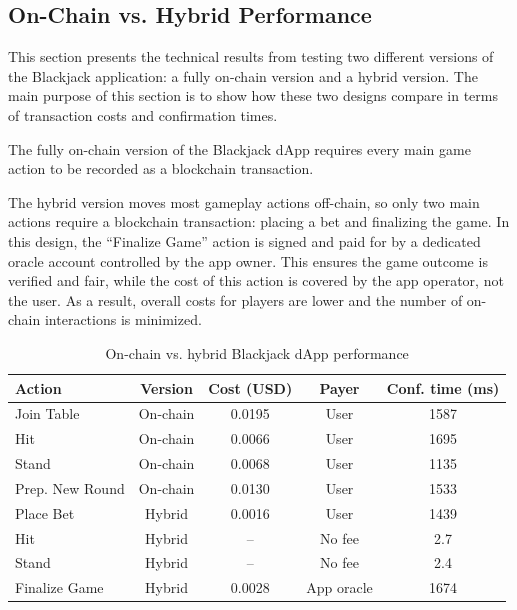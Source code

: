 \documentclass[10pt,conference]{IEEEtran}
\begin{document}
\subsection{On-Chain vs. Hybrid Performance}

This section presents the technical results from testing two different versions of the Blackjack
application: a fully on-chain version and a hybrid version. The main purpose of this section is to
show how these two designs compare in terms of transaction costs and confirmation times.

The fully on-chain version of the Blackjack dApp requires every main game action to be recorded as a blockchain transaction.

The hybrid version moves most gameplay actions off-chain, so only two main actions require a
blockchain transaction: placing a bet and finalizing the game. In this design, the “Finalize Game”
action is signed and paid for by a dedicated oracle account controlled by the app owner. This
ensures the game outcome is verified and fair, while the cost of this action is covered by the app
operator, not the user. As a result, overall costs for players are lower and the number of on-chain
interactions is minimized.

\begin{table}[htbp]
\centering
\caption{On-chain vs. hybrid Blackjack dApp performance}
\label{tab:comparison_blackjack}
\setlength{\tabcolsep}{3.5pt}
\begin{tabular}{lcccc}
\hline
\textbf{Action} & \textbf{Version} & \textbf{Cost (USD)} & \textbf{Payer} & \textbf{Conf. time (ms)} \\
\hline
Join Table           & On-chain & 0.0195 & User        & 1587 \\
Hit                  & On-chain & 0.0066 & User        & 1695 \\
Stand                & On-chain & 0.0068 & User        & 1135 \\
Prep. New Round      & On-chain & 0.0130 & User        & 1533 \\
Place Bet            & Hybrid   & 0.0016 & User        & 1439 \\
Hit                  & Hybrid   & –           & No fee      & 2.7  \\
Stand                & Hybrid   & –          & No fee      & 2.4  \\
Finalize Game        & Hybrid   & 0.0028 & App oracle  & 1674 \\
\hline
\end{tabular}
\end{table}
\end{document}
